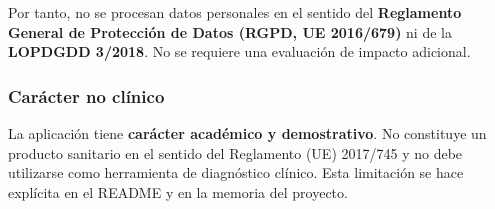 Por tanto, no se procesan datos personales en el sentido del \textbf{Reglamento General de Protección de Datos (RGPD, UE 2016/679)} ni de la \textbf{LOPDGDD 3/2018}. No se requiere una evaluación de impacto adicional.

\subsubsection{Carácter no clínico}

La aplicación tiene \textbf{carácter académico y demostrativo}. No constituye un producto sanitario en el sentido del Reglamento (UE) 2017/745 y no debe utilizarse como herramienta de diagnóstico clínico. Esta limitación se hace explícita en el README y en la memoria del proyecto.
